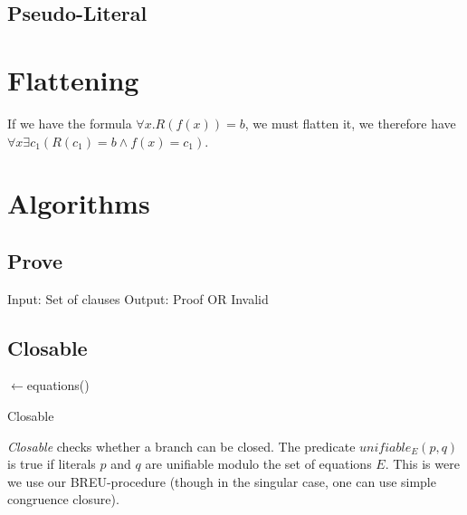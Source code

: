 \documentclass{article}
\begin{document}
\subsection{Pseudo-Literal}



\section{Flattening}
If we have the formula $\forall x . R(f(x)) = b$, we must flatten it, we therefore have $\forall x \exists c_1 (R(c_1) = b \wedge f(x) = c_1)$.


\section{Algorithms}

\subsection{Prove}
Input: Set of clauses
Output: Proof OR Invalid

\begin{algorithm}[H]

  \SetAlgoLined
  
  }
  \Return \false\;

  \caption{CloseTable}
  \label{alg:close-table}
\end{algorithm}


\subsection{Closable}
\begin{algorithm}[H]

  \SetAlgoLined
  \KwIn{\branch}
  \eqs$\leftarrow$equations(\branch)
  \Return \false\;

  \caption{Closable}
  \label{alg:close-branch-w-clause}
\end{algorithm}



\emph{Closable} checks whether a branch can be closed. The predicate
$unifiable_E(p, q)$ is true if literals $p$ and $q$ are unifiable
modulo the set of equations $E$. This is were we use our
BREU-procedure (though in the singular case, one can use simple
congruence closure).
\end{document}

